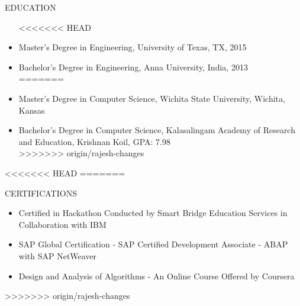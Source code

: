 \documentclass{resume} %
\begin{document}
\begin{rSection}{EDUCATION}
    \begin{flushleft}
    \begin{itemize}
<<<<<<< HEAD
                    \item Master's Degree in Engineering, University of Texas, TX, 2015 \\
                    \item Bachelor's Degree in Engineering, Anna University, India, 2013 \\
=======
                    \item Master's Degree in Computer Science, Wichita State University, Wichita, Kansas \\
                    \item Bachelor's Degree in Computer Science, Kalasalingam Academy of Research and Education, Krishnan Koil, GPA: 7.98 \\
>>>>>>> origin/rajesh-changes
            \end{itemize}
    \end{flushleft}
\end{rSection}

<<<<<<< HEAD
=======
\begin{rSection}{CERTIFICATIONS}
    \begin{flushleft}
            \begin{itemize}
                    \item Certified in Hackathon Conducted by Smart Bridge Education Services in Collaboration with IBM \\
                    \item SAP Global Certification {-} SAP Certified Development Associate {-} ABAP with SAP NetWeaver \\
                    \item Design and Analysis of Algorithms {-} An Online Course Offered by Coursera \\
                            \end{itemize}
        \end{flushleft}
\end{rSection}
>>>>>>> origin/rajesh-changes
\end{document}
